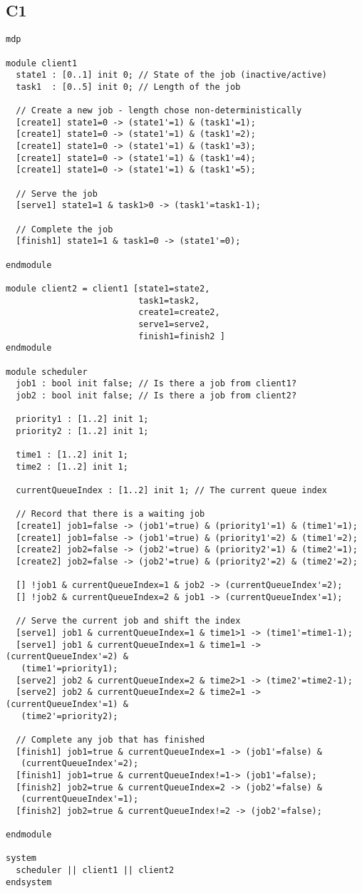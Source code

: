 \subsection{C1}

\begin{verbatim}
mdp

module client1
  state1 : [0..1] init 0; // State of the job (inactive/active)
  task1  : [0..5] init 0; // Length of the job
  
  // Create a new job - length chose non-deterministically
  [create1] state1=0 -> (state1'=1) & (task1'=1);
  [create1] state1=0 -> (state1'=1) & (task1'=2);
  [create1] state1=0 -> (state1'=1) & (task1'=3);
  [create1] state1=0 -> (state1'=1) & (task1'=4);
  [create1] state1=0 -> (state1'=1) & (task1'=5);

  // Serve the job
  [serve1] state1=1 & task1>0 -> (task1'=task1-1);

  // Complete the job
  [finish1] state1=1 & task1=0 -> (state1'=0);

endmodule

module client2 = client1 [state1=state2,
                          task1=task2,
                          create1=create2,
                          serve1=serve2,
                          finish1=finish2 ]
endmodule

module scheduler
  job1 : bool init false; // Is there a job from client1?
  job2 : bool init false; // Is there a job from client2?

  priority1 : [1..2] init 1;
  priority2 : [1..2] init 1;

  time1 : [1..2] init 1;
  time2 : [1..2] init 1;

  currentQueueIndex : [1..2] init 1; // The current queue index

  // Record that there is a waiting job
  [create1] job1=false -> (job1'=true) & (priority1'=1) & (time1'=1);
  [create1] job1=false -> (job1'=true) & (priority1'=2) & (time1'=2);
  [create2] job2=false -> (job2'=true) & (priority2'=1) & (time2'=1);
  [create2] job2=false -> (job2'=true) & (priority2'=2) & (time2'=2);

  [] !job1 & currentQueueIndex=1 & job2 -> (currentQueueIndex'=2);
  [] !job2 & currentQueueIndex=2 & job1 -> (currentQueueIndex'=1);

  // Serve the current job and shift the index
  [serve1] job1 & currentQueueIndex=1 & time1>1 -> (time1'=time1-1);
  [serve1] job1 & currentQueueIndex=1 & time1=1 -> (currentQueueIndex'=2) &
   (time1'=priority1);
  [serve2] job2 & currentQueueIndex=2 & time2>1 -> (time2'=time2-1);
  [serve2] job2 & currentQueueIndex=2 & time2=1 -> (currentQueueIndex'=1) &
   (time2'=priority2);

  // Complete any job that has finished
  [finish1] job1=true & currentQueueIndex=1 -> (job1'=false) &
   (currentQueueIndex'=2);
  [finish1] job1=true & currentQueueIndex!=1-> (job1'=false);
  [finish2] job2=true & currentQueueIndex=2 -> (job2'=false) &
   (currentQueueIndex'=1);
  [finish2] job2=true & currentQueueIndex!=2 -> (job2'=false);

endmodule

system
  scheduler || client1 || client2
endsystem

\end{verbatim}
